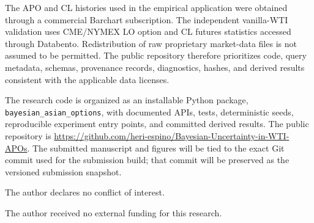 \documentclass[HARVARD,Utopia2COL]{WileyNJDv5}
\begin{document}
The APO and CL histories used in the empirical application were obtained through a commercial Barchart subscription. The independent vanilla-WTI validation uses CME/NYMEX LO option and CL futures statistics accessed through Databento. Redistribution of raw proprietary market-data files is not assumed to be permitted. The public repository therefore prioritizes code, query metadata, schemas, provenance records, diagnostics, hashes, and derived results consistent with the applicable data licenses.

The research code is organized as an installable Python package, \texttt{bayesian\_asian\_options}, with documented APIs, tests, deterministic seeds, reproducible experiment entry points, and committed derived results. The public repository is \url{https://github.com/heri-espino/Bayesian-Uncertainty-in-WTI-APOs}. The submitted manuscript and figures will be tied to the exact Git commit used for the submission build; that commit will be preserved as the versioned submission snapshot.

The author declares no conflict of interest.

The author received no external funding for this research.


\end{document}
